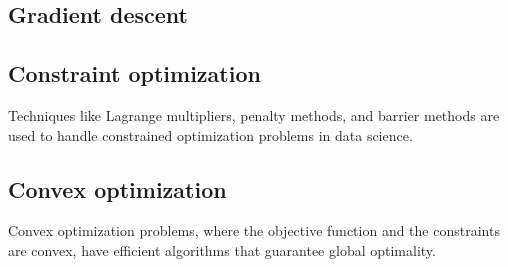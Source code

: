 \subsection{Gradient descent}

\subsection{Constraint optimization}

Techniques like Lagrange multipliers, penalty methods, and barrier methods are used to
handle constrained optimization problems in data science.

\subsection{Convex optimization}

Convex optimization problems, where the objective function and the constraints are convex,
have efficient algorithms that guarantee global optimality.

%
%
%
%
%
%
%

